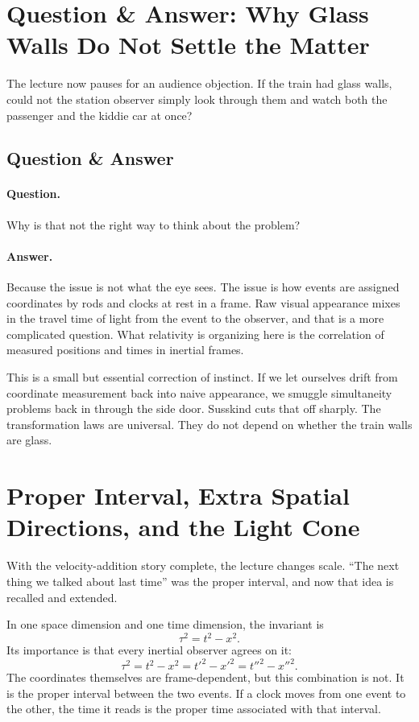 \section{Question \& Answer: Why Glass Walls Do Not Settle the Matter}

The lecture now pauses for an audience objection. If the train had glass walls, could not the station observer simply look through them and watch both the passenger and the kiddie car at once?

\subsection{Question \& Answer}

\paragraph{Question.} Why is that not the right way to think about the problem?

\paragraph{Answer.} Because the issue is not what the eye sees. The issue is how events are assigned coordinates by rods and clocks at rest in a frame. Raw visual appearance mixes in the travel time of light from the event to the observer, and that is a more complicated question. What relativity is organizing here is the correlation of measured positions and times in inertial frames.

This is a small but essential correction of instinct. If we let ourselves drift from coordinate measurement back into naive appearance, we smuggle simultaneity problems back in through the side door. Susskind cuts that off sharply. The transformation laws are universal. They do not depend on whether the train walls are glass.

\section{Proper Interval, Extra Spatial Directions, and the Light Cone}

With the velocity-addition story complete, the lecture changes scale. ``The next thing we talked about last time'' was the proper interval, and now that idea is recalled and extended.

In one space dimension and one time dimension, the invariant is
\begin{equation}
\tau^2=t^2-x^2.
\end{equation}
Its importance is that every inertial observer agrees on it:
\begin{equation}
\tau^2=t^2-x^2=t'^2-x'^2=t''^2-x''^2.
\end{equation}
The coordinates themselves are frame-dependent, but this combination is not. It is the proper interval between the two events. If a clock moves from one event to the other, the time it reads is the proper time associated with that interval.

